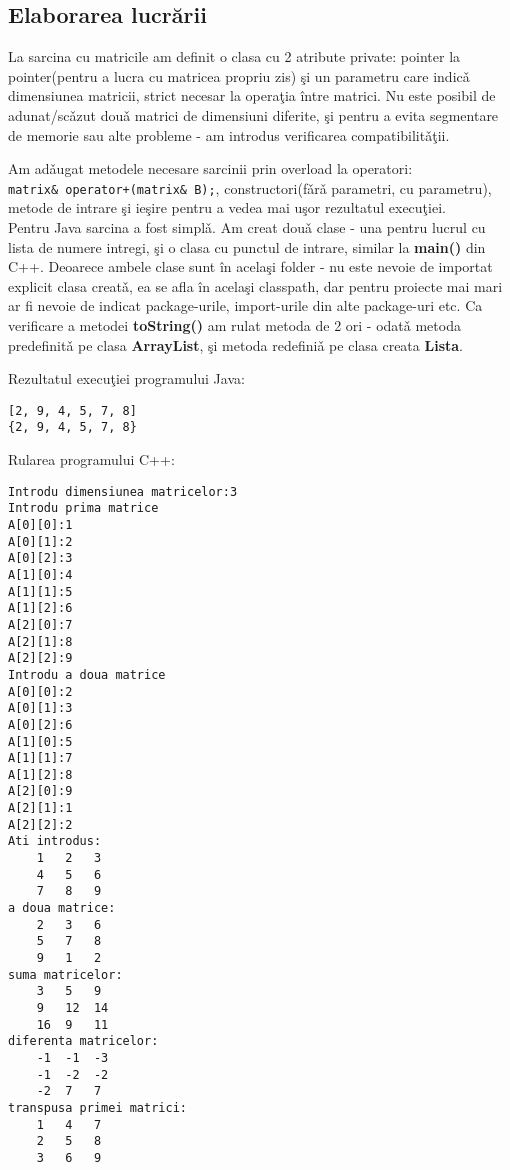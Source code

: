 \subsection{Elaborarea lucr\u{a}rii}
La sarcina cu matricile am definit o clasa cu 2 atribute private: pointer 
la pointer(pentru a lucra cu matricea propriu zis) \c{s}i un parametru 
care indic\v{a} dimensiunea matricii, strict necesar la opera\c{t}ia 
\^{i}ntre matrici. Nu este posibil de adunat/sc\v{a}zut dou\v{a} matrici 
de dimensiuni diferite, \c{s}i pentru a evita segmentare de memorie sau alte
probleme - am introdus verificarea compatibilit\v{a}\c{t}ii.

Am ad\v{a}ugat metodele necesare sarcinii prin overload la operatori:\\
\texttt{matrix\& operator+(matrix\& B);}, constructori(f\v{a}r\v{a} parametri,
cu parametru), metode de intrare \c{s}i ie\c{s}ire pentru a vedea mai
u\c{s}or rezultatul execu\c{t}iei.\\

Pentru Java sarcina a fost simpl\v{a}. Am creat dou\v{a} clase - una pentru
lucrul cu lista de numere intregi, \c{s}i o clasa cu punctul de intrare, 
similar la \textbf{main()} din C++. Deoarece ambele clase sunt \^{i}n 
acela\c{s}i folder - nu este nevoie de importat explicit clasa creat\v{a},
ea se afla \^{i}n acela\c{s}i classpath, dar pentru proiecte mai mari ar
fi nevoie de indicat package-urile, import-urile din alte package-uri etc.
Ca verificare a metodei \textbf{toString()} am rulat metoda de 2 ori - 
odat\v{a} metoda predefinit\v{a} pe clasa \textbf{ArrayList}, \c{s}i 
metoda redefini\v{a} pe clasa creata \textbf{Lista}.

Rezultatul execu\c{t}iei programului Java:
\begin{verbatim}
[2, 9, 4, 5, 7, 8]
{2, 9, 4, 5, 7, 8}
\end{verbatim}

Rularea programului C++:
\begin{verbatim}
Introdu dimensiunea matricelor:3
Introdu prima matrice
A[0][0]:1
A[0][1]:2
A[0][2]:3
A[1][0]:4
A[1][1]:5
A[1][2]:6
A[2][0]:7
A[2][1]:8
A[2][2]:9
Introdu a doua matrice
A[0][0]:2
A[0][1]:3
A[0][2]:6
A[1][0]:5
A[1][1]:7
A[1][2]:8
A[2][0]:9
A[2][1]:1
A[2][2]:2
Ati introdus:
    1   2   3
    4   5   6
    7   8   9
a doua matrice:
    2   3   6
    5   7   8
    9   1   2
suma matricelor:
    3   5   9
    9   12  14
    16  9   11
diferenta matricelor:
    -1  -1  -3
    -1  -2  -2
    -2  7   7
transpusa primei matrici:
    1   4   7
    2   5   8
    3   6   9
\end{verbatim}

